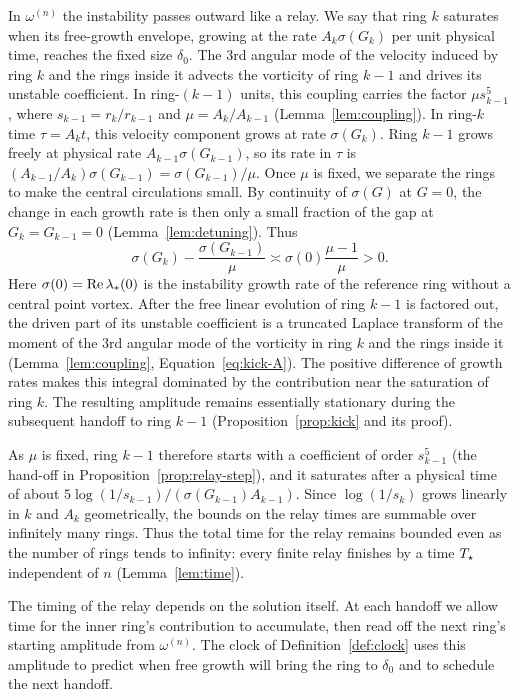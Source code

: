 In $\omega^{(n)}$ the instability passes outward like a relay. We say that
ring $k$ saturates when its free-growth envelope, growing at the rate
$A_k\sigma(G_k)$ per unit physical time, reaches the fixed size $\delta_0$.
The 3rd angular mode of the velocity induced by ring $k$ and the rings
inside it advects the vorticity of ring $k-1$ and drives its unstable
coefficient. In ring-$(k-1)$ units, this coupling carries the factor
$\mu s_{k-1}^5$, where $s_{k-1}=r_k/r_{k-1}$ and
$\mu=A_k/A_{k-1}$ (Lemma~\ref{lem:coupling}). In ring-$k$ time $\tau=A_kt$,
this velocity component grows at rate $\sigma(G_k)$. Ring $k-1$ grows freely
at physical rate $A_{k-1}\sigma(G_{k-1})$, so its rate in $\tau$ is
$(A_{k-1}/A_k)\sigma(G_{k-1})=\sigma(G_{k-1})/\mu$.
Once $\mu$ is fixed, we separate the rings to make the central circulations
small. By continuity of $\sigma(G)$ at $G=0$, the change in each growth rate is
then only a small fraction of the gap at $G_k=G_{k-1}=0$
(Lemma~\ref{lem:detuning}). Thus
\[
\sigma(G_k)-\frac{\sigma(G_{k-1})}{\mu}
\asymp\sigma(0)\frac{\mu-1}{\mu}>0.
\]
Here $\sigma(0)=\Re\lambda_*(0)$ is the instability growth rate of the reference
ring without a central point vortex. After the free linear evolution of ring
$k-1$ is factored out, the driven part of its unstable coefficient is a
truncated Laplace transform of the moment of the 3rd angular mode of the vorticity in ring
$k$ and the rings inside it (Lemma~\ref{lem:coupling},
Equation~\eqref{eq:kick-A}). The positive difference of growth rates makes
this integral dominated by the contribution near the saturation of ring $k$.
The resulting amplitude remains essentially stationary during the subsequent
handoff to ring $k-1$ (Proposition~\ref{prop:kick} and its proof).

As $\mu$ is fixed, ring $k-1$ therefore starts with a coefficient of order
$s_{k-1}^5$ (the hand-off in Proposition~\ref{prop:relay-step}), and it
saturates after a physical time of about
$5\log(1/s_{k-1})/(\sigma(G_{k-1})A_{k-1})$. Since $\log(1/s_k)$ grows
linearly in $k$ and $A_k$ geometrically, the bounds on the relay times are
summable over infinitely many rings. Thus the total time for the relay remains
bounded even as the number of rings tends to infinity: every finite relay
finishes by a time $T_\star$ independent of $n$ (Lemma~\ref{lem:time}).

The timing of the relay depends on the solution itself. At each handoff we
allow time for the inner ring's contribution to accumulate, then read off the
next ring's starting amplitude from $\omega^{(n)}$. The clock of
Definition~\ref{def:clock} uses this amplitude to predict when free growth
will bring the ring to $\delta_0$ and to schedule the next handoff.

